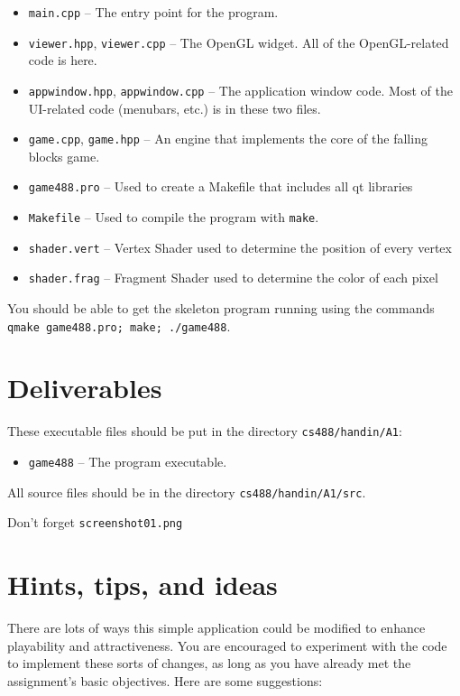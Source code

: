 \begin{itemize}
        \item \texttt{main.cpp} -- The entry point for the program.
        \item \texttt{viewer.hpp}, \texttt{viewer.cpp} -- The OpenGL
          widget. All of the OpenGL-related code is here.
        \item \texttt{appwindow.hpp}, \texttt{appwindow.cpp} -- The
          application window code. Most of the UI-related code
          (menubars, etc.) is in these two files.
	\item \texttt{game.cpp}, \texttt{game.hpp} -- An engine that implements
		the core of the falling blocks game.
        \item \texttt{game488.pro} -- Used to create a Makefile that includes
            all qt libraries
	\item \texttt{Makefile} -- Used to compile the program with \texttt{make}.
        \item \texttt{shader.vert} -- Vertex Shader used to determine the
            position of every vertex
        \item \texttt{shader.frag} -- Fragment Shader used to determine the
            color of each pixel
\end{itemize}

You should be able to get the skeleton program running using the
commands \texttt{qmake game488.pro; make; ./game488}.

\section{Deliverables}

These executable files should be put in the directory \texttt{cs488/handin/A1}:

\begin{itemize}
	\item \texttt{game488} -- The program executable.
\end{itemize}

All source files should be in the directory \texttt{cs488/handin/A1/src}.

Don't forget \texttt{screenshot01.png}

\section{Hints, tips, and ideas}

There are lots of ways this simple application could be modified
to enhance playability and attractiveness.  You are encouraged to
experiment with the code to implement these sorts of changes, as
long as you have already met the assignment's basic objectives.
Here are some suggestions:

